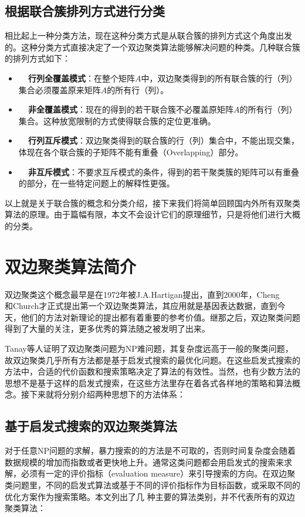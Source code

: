 \subsection{根据联合簇排列方式进行分类}
相比起上一种分类方法，现在这种分类方式是从联合簇的排列方式这个角度出发的。这种分类方式直接决定了一个双边聚类算法能够解决问题的种类。几种联合簇的排列方式如下：
\begin{itemize}
  \item \textbf{~~行列全覆盖模式}：在整个矩阵$A$中，双边聚类得到的所有联合簇的行（列）集合必须覆盖原来矩阵$A$的所有行（列）。
  \item \textbf{~~非全覆盖模式}：现在的得到的若干联合簇不必覆盖原矩阵$A$的所有行（列）集合。这种放宽限制的方式使得联合簇的定位更准确。
  \item \textbf{~~行列互斥模式}：双边聚类得到的联合簇的行（列）集合中，不能出现交集，体现在各个联合簇的子矩阵不能有重叠（Overlapping）部分。
  \item \textbf{~~非互斥模式}：不要求互斥模式的条件，得到的若干聚类簇的矩阵可以有重叠的部分，在一些特定问题上的解释性更强。
\end{itemize}

以上就是关于联合簇的概念和分类介绍，接下来我们将简单回顾国内外所有双聚类算法的原理。由于篇幅有限，本文不会设计它们的原理细节，只是将他们进行大概的分类。

\section{双边聚类算法简介}
\label{sec:algorithms}
双边聚类这个概念最早是在1972年被J.A.Hartigan提出，直到2000年，Cheng\\和Church才正式提出第一个双边聚类算法，其应用就是基因表达数据，直到今天，他们的方法对新理论的提出都有着重要的参考价值。继那之后，双边聚类问题得到了大量的关注，更多优秀的算法随之被发明了出来。

Tanay等人证明了双边聚类问题为NP难问题，其复杂度远高于一般的聚类问题，故双边聚类几乎所有方法都是基于启发式搜索的最优化问题。在这些启发式搜索的方法中，合适的代价函数和搜索策略决定了算法的有效性。当然，也有少数方法的思想不是基于这样的启发式搜索，在这些方法里存在着各式各样地的策略和算法概念。接下来就将分别介绍两种思想下的方法体系：

\subsection{基于启发式搜索的双边聚类算法}
\label{search}
对于任意NP问题的求解，暴力搜索的的方法是不可取的，否则时间复杂度会随着数据规模的增加而指数或者更快地上升。通常这类问题都会用启发式的搜索来求解，必须有一定的评价指标（evaluation measure）来引导搜索的方向。在双边聚类问题里，不同的启发式算法或基于不同的评价指标作为目标函数，或采取不同的优化方案作为搜索策略。本文列出了几
种主要的算法类别，并不代表所有的双边聚类算法：

